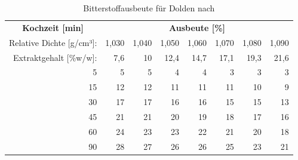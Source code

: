\documentclass[a4paper,parskip=half]{scrartcl}
\begin{document}
\begin{table}[H]
\centering
\begin{tabular}{rrrrrrrr} 
\toprule
\multicolumn{1}{c}{\textbf{Kochzeit [min]}} & \multicolumn{7}{c}{\textbf{Ausbeute [\%]}}  \\
Relative Dichte [g/cm³]:                                        & 1,030 & 1,040 & 1,050 & 1,060 & 1,070 & 1,080  & 1,090                   \\
Extraktgehalt [\%w/w]:                                            & 7,6 & 10 & 12,4 & 14,7 & 17,1 & 19,3  & 21,6                   \\                                            
\midrule

5                                            & 5     & 5     & 4     & 4     & 3     & 3      & 3                          \\
15                                           & 12    & 12    & 11    & 11    & 11    & 10     & 9                          \\
30                                           & 17    & 17    & 16    & 16    & 15    & 15     & 13                         \\
45                                           & 21    & 21    & 20    & 19    & 18    & 17     & 16                         \\
60                                           & 24    & 23    & 23    & 22    & 21    & 20     & 18                         \\
90                                           & 28    & 27    & 26    & 26    & 25    & 23     & 21                         \\
\bottomrule
\end{tabular}
\caption{Bitterstoffausbeute für Dolden nach \citeauthor{Mosher1994} \parencite[51]{Holle2010}}
\label{table:mosherbakt}
\end{table}
\end{document}
